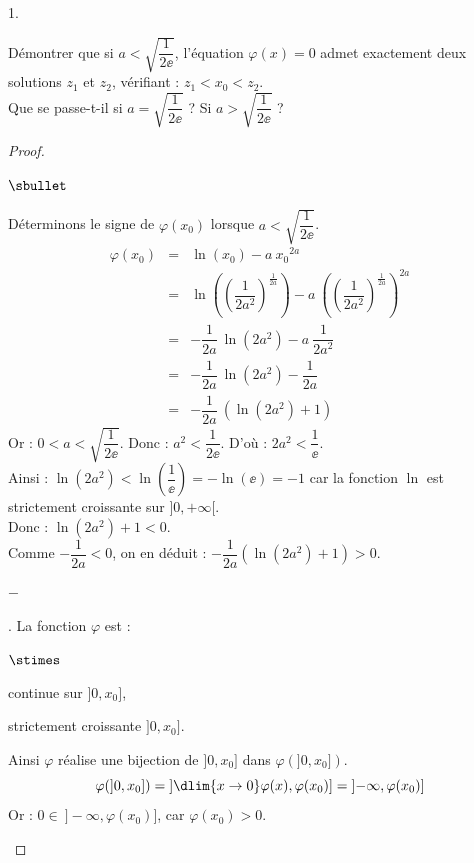\begin{noliste}{1.}
\item Démontrer que si $a<\sqrt{\dfrac{1}{2\ee}}$, l'équation
  $\varphi(x)=0$ admet exactement deux solutions $z_1$ et $z_2$,
  vérifiant : $z_1<x_0<z_2$.\\
  Que se passe-t-il si $a=\sqrt{\dfrac{1}{2\ee}}$ ? Si
  $a>\sqrt{\dfrac{1}{2\ee}}$ ?

  \begin{proof}~
    \begin{noliste}{$\sbullet$}
    \item Déterminons le signe de $\varphi(x_0)$ lorsque 
      $a<\sqrt{\dfrac{1}{2\ee}}$.
      \[
      \begin{array}{rcl}
        \varphi(x_0) & = & \ln(x_0) - a \ x_0{}^{2a}
        \\[.2cm]
        & = &  
        \ln\left(\left(\dfrac{1}{2a^2}\right)^{\frac{1}{2a}}\right)
        - a \ \left(\left(\dfrac{1}{2a^2}\right)^{\frac{1}{2a}}
        \right)^{2a} 
        \\[.6cm]
        & = & -\dfrac{1}{2a} \ \ln(2a^2) - a \ \dfrac{1}{2a^2}
        \\[0.4cm]
        & = &  -\dfrac{1}{2a} \ \ln(2a^2) - \dfrac{1}{2a}
        \\[0.4cm]
        & = &  -\dfrac{1}{2a} \ (\ln(2a^2)+1)
      \end{array}
      \]
      Or : $0<a<\sqrt{\dfrac{1}{2\ee}}$. Donc : $a^2<\dfrac{1}{2\ee}$.
      D'où : $2a^2 <\dfrac{1}{\ee}$.\\[.1cm]
      Ainsi : $\ln(2a^2)<\ln\left(\dfrac{1}{\ee}\right)=-\ln(\ee)=-1$ car la 
      fonction $\ln$ est strictement croissante sur $]0,+\infty[$.\\[.1cm]
      Donc : $\ln(2a^2)+1<0$. \\[.1cm]
      Comme $-\dfrac{1}{2a}<0$, on en déduit : 
      $-\dfrac{1}{2a}(\ln(2a^2)+1)>0$. %
      

      \newpage
      
      
      \begin{noliste}{$-$}
      \item \dashuline{Étude sur $]0,x_0]$}. La fonction $\varphi$ est
        :
	\begin{noliste}{$\stimes$}
	\item continue sur $]0,x_0]$,
	\item strictement croissante $]0,x_0]$.
	\end{noliste}
        Ainsi $\varphi$ réalise une bijection de $]0,x_0]$ dans
        $\varphi(]0,x_0])$.
        \[
        \varphi(]0,x_0])= \left] \dlim{x \to 0}
          \varphi(x),\varphi(x_0)\right]= \left]-\infty,
          \varphi(x_0)\right]
        \]
        Or : $0\in \ ]-\infty, \varphi(x_0)]$, car $\varphi(x_0)>0$.%
        \conc{Donc l'équation $\varphi(x)=0$ admet exactement une
          solution sur $]0,x_0]$ \\ que l'on notera $z_1$.}
        

\end{noliste}
\end{noliste}
\end{proof}
\end{noliste}
